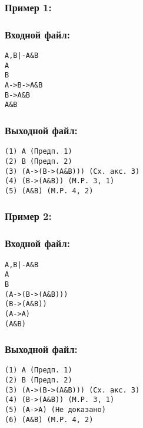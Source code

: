 \documentclass[11pt,a4paper,oneside]{article}
\begin{document}
\subsubsection*{Пример 1:}
\begin{minipage}[t]{.5\textwidth}
\subsubsection*{Входной файл:}
\begin{verbatim}
A,B|-A&B
A
B
A->B->A&B
B->A&B
A&B
\end{verbatim}
\end{minipage}
\begin{minipage}[t]{.5\textwidth}
\subsubsection*{Выходной файл:}
\begin{verbatim}
(1) A (Предп. 1)
(2) B (Предп. 2)
(3) (A->(B->(A&B))) (Сх. акс. 3)
(4) (B->(A&B)) (M.P. 3, 1)
(5) (A&B) (M.P. 4, 2)
\end{verbatim}
\end{minipage}

\subsubsection*{Пример 2:}
\begin{minipage}[t]{.5\textwidth}
\subsubsection*{Входной файл:}
\begin{verbatim}
A,B|-A&B
A
B
(A->(B->(A&B)))
(B->(A&B))
(A->A)
(A&B)
\end{verbatim}
\end{minipage}
\begin{minipage}[t]{.5\textwidth}
\subsubsection*{Выходной файл:}
\begin{verbatim}
(1) A (Предп. 1)
(2) B (Предп. 2)
(3) (A->(B->(A&B))) (Сх. акс. 3)
(4) (B->(A&B)) (M.P. 3, 1)
(5) (A->A) (Не доказано)
(6) (A&B) (M.P. 4, 2)
\end{verbatim}
\end{minipage}
\end{document}
